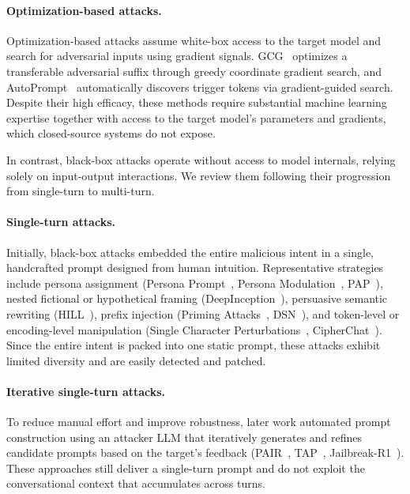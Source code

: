 \documentclass[a4paper,fleqn]{cas-sc}
\begin{document}
\paragraph{Optimization-based attacks.}
Optimization-based attacks assume white-box access to the target model and search for adversarial inputs using gradient signals.
GCG~\cite{gcg} optimizes a transferable adversarial suffix through greedy coordinate gradient search, and AutoPrompt~\cite{autoprompt} automatically discovers trigger tokens via gradient-guided search.
Despite their high efficacy, these methods require substantial machine learning expertise together with access to the target model's parameters and gradients, which closed-source systems do not expose.

In contrast, black-box attacks operate without access to model internals, relying solely on input-output interactions.
We review them following their progression from single-turn to multi-turn.

\paragraph{Single-turn attacks.}
Initially, black-box attacks embedded the entire malicious intent in a single, handcrafted prompt designed from human intuition.
Representative strategies include persona assignment (Persona Prompt~\cite{personaprompts}, Persona Modulation~\cite{personamod}, PAP~\cite{pap}), nested fictional or hypothetical framing (DeepInception~\cite{deepinception}), persuasive semantic rewriting (HILL~\cite{hill}), prefix injection (Priming Attacks~\cite{priming}, DSN~\cite{dsn}), and token-level or encoding-level manipulation (Single Character Perturbations~\cite{scp}, CipherChat~\cite{cipherchat}).
Since the entire intent is packed into one static prompt, these attacks exhibit limited diversity and are easily detected and patched.

\paragraph{Iterative single-turn attacks.}
To reduce manual effort and improve robustness, later work automated prompt construction using an attacker LLM that iteratively generates and refines candidate prompts based on the target's feedback (PAIR~\cite{pair}, TAP~\cite{tap}, Jailbreak-R1~\cite{jbr1}).
These approaches still deliver a single-turn prompt and do not exploit the conversational context that accumulates across turns.
\end{document}

